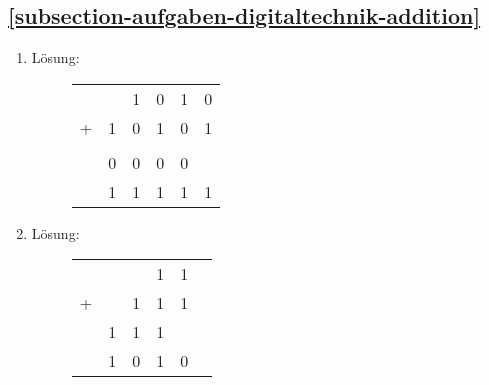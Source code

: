 \subsection*{\ref{subsection-aufgaben-digitaltechnik-addition} }

\begin{enumerate}
	\item Lösung:

\begin{figure}[htb]
\centering
\begin{tabular}{cccccc}
   & & 1 & 0 & 1 & 0 \\
+ & 1 & 0   &1 & 0 & 1 \\
     & & & & & \\
& \tiny{0} & \tiny{0} & \tiny{0} & \tiny{0} & \\
\hline
 & 1 & 1 & 1 & 1 & 1 \\
\end{tabular}
\end{figure}

\item Lösung:

\begin{figure}[htb]
\centering
\begin{tabular}{cccccc}
    & &  & 1 & 1 \\
+ & &1 &1& 1 \\
    & \tiny{1} & \tiny{1} & \tiny{1} & & \\
\hline
& 1 & 0 & 1 & 0 \\
\end{tabular}
\end{figure}

\end{enumerate}